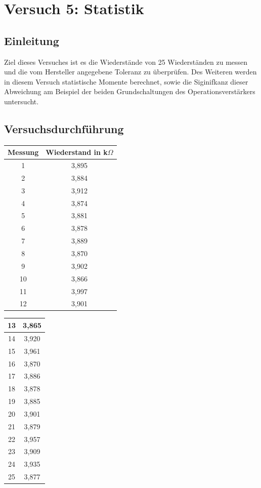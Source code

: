 \chapter{Versuch 5: Statistik}

\section{Einleitung}
Ziel dieses Versuches ist es die Wiederstände von 25 Wiederständen zu messen und
die vom Hersteller angegebene Toleranz zu überprüfen. Des Weiteren werden in diesem
Versuch statistische Momente berechnet, sowie die Siginifkanz dieser Abweichung am
Beispiel der beiden Grundschaltungen des Operationsverstärkers untersucht.

\section{Versuchsdurchführung}

\begin{tabular}[h]{c|c}
	Messung & Wiederstand in k$\Omega$ \\
	\hline
	1 & 3,895\\
	\hline
	2& 3,884\\
	\hline
	3 & 3,912\\
	\hline
	4 & 3,874\\
	\hline
	5& 3,881\\
	\hline
	6 & 3,878\\
	\hline
	7 & 3,889\\
	\hline
	8& 3,870\\
	\hline
	9 & 3,902\\
	\hline
	10 & 3,866\\
	\hline
	11& 3,997\\
	\hline
	12& 3,901
    \label{tab:Messreihe Wiederstände 1}
\end{tabular}
\begin{tabular}[h]{c|c}  
	13& 3,865\\
	\hline
	14& 3,920\\
	\hline
	15& 3,961\\
	\hline
	16& 3,870\\
	\hline
	17& 3,886\\
	\hline
	18& 3,878\\
	\hline
	19& 3,885\\
	\hline
	20& 3,901\\
	\hline
	21& 3,879\\
	\hline
	22& 3,957\\
	\hline
	23& 3,909\\
	\hline
	24& 3,935\\
	\hline
	25& 3,877
	\label{tab:Messreihe Wiederstände 2}
\end{tabular}

